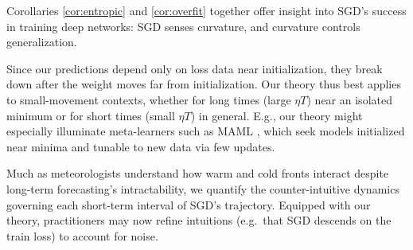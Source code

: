\documentclass{article}
\theoremstyle{plain}
\theoremstyle{definition}
\begin{document}

        Corollaries \ref{cor:entropic} and \ref{cor:overfit} together offer
        insight into SGD's success in training deep networks: SGD senses
        curvature, and curvature controls generalization.

        Since our predictions depend only on loss data near initialization,
        they break down after the weight moves far from initialization.  Our
        theory thus best applies to small-movement contexts, whether for long
        times (large $\eta T$) near an isolated minimum or for short times
        (small $\eta T$) in general.  E.g., our theory might especially
        illuminate meta-learners such as MAML \citep{fi17}, which seek models
        initialized near minima and tunable to new data via few updates.

        Much as meteorologists understand how warm and cold fronts interact
        despite long-term forecasting's intractability, we quantify the
        counter-intuitive dynamics governing each short-term interval of SGD's
        trajectory.  Equipped with our theory, practitioners may now
        refine intuitions (e.g.\ that SGD descends on the train loss) to
        account for noise.
       
\end{document}
